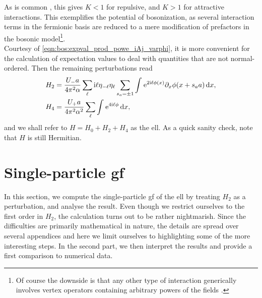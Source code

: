 As is common \cite[]{Giamarchi_2004}, this gives $K<1$ for repulsive, and $K>1$ for attractive interactions.
This exemplifies the potential of bosonization, as several interaction terms in the fermionic basis are reduced to a mere modification of prefactors in the bosonic model\footnote{Of course the downside is that any other type of interaction generically involves vertex operators containing arbitrary powers of the fields \cite[]{Giamarchi_2004}.}.\\
Courtesy of \autoref{eqn:bos:expval_prod_powe_iAj_varphi}, it is more convenient for the calculation of expectation values to deal with quantities that are not normal-ordered.
Then the remaining perturbations read
\begin{subequations}\begin{align}
H_2 &= \frac{U_-a}{4\pi^2\alpha} \sum_\ell \text{i}\ell \eta_{-\ell} \eta_\ell \sum_{s_a=\pm 1} \int_{ }^{ } \text{e}^{2\text{i}\ell\phi(x)} \partial_x\phi(x+s_aa) \,\mathrm{d}x,\\
H_4 &= \frac{U_+a}{4\pi^2\alpha^2} \sum_\ell \int_{ }^{ } \text{e}^{4\text{i}\ell\phi} \,\mathrm{d}x,
\end{align}\label{eqn:ell:bos:H2H4_model}\end{subequations}
and we shall refer to $H=H_0+H_2+H_4$ as the \gls{ell}.
As a quick sanity check, note that $H$ is still Hermitian.
\section{Single-particle \texorpdfstring{\acrlong{gf}}{GF}}\label{sec:ell:gf}
In this section, we compute the single-particle \gls{gf} of the \gls{ell} by treating $H_2$ as a perturbation, and analyse the result.
Even though we restrict ourselves to the first order in $H_2$, the calculation turns out to be rather nightmarish.
Since the difficulties are primarily mathematical in nature, the details are spread over several appendices and here we limit ourselves to highlighting some of the more interesting steps.
In the second part, we then interpret the results and provide a first comparison to numerical data.
